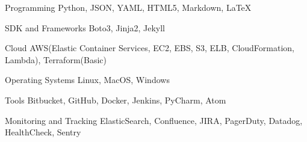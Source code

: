 

\begin{cvskills}

  \cvskill
    {Programming} %
    {Python, JSON, YAML, HTML5, Markdown, LaTeX} %

  \cvskill
    {SDK and Frameworks} %
    {Boto3, Jinja2, Jekyll} %

  \cvskill
    {Cloud} %
    {AWS(Elastic Container Services, EC2, EBS, S3, ELB, CloudFormation, Lambda), Terraform(Basic)} %


  \cvskill
    {Operating Systems} %
    {Linux, MacOS, Windows} %


  \cvskill
    {Tools} %
    {Bitbucket, GitHub, Docker, Jenkins, PyCharm, Atom} %


  \cvskill
    {Monitoring and Tracking} %
    {ElasticSearch, Confluence, JIRA, PagerDuty, Datadog, HealthCheck, Sentry } %

\end{cvskills}

